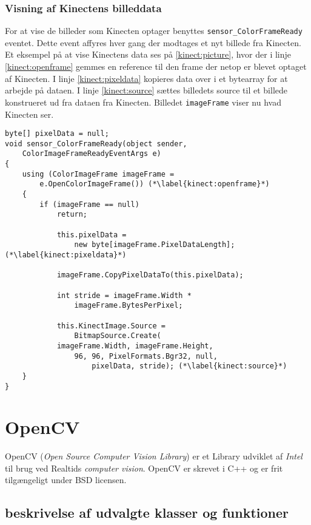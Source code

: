 \subsubsection{Visning af Kinectens billeddata}
For at vise de billeder som Kinecten optager benyttes \lstinline[style=csharp]!sensor_ColorFrameReady! eventet. 
Dette event affyres hver gang der modtages et nyt billede fra Kinecten. 
Et eksempel på at vise Kinectens data ses på \cref{kinect:picture}, hvor der i linje \ref{kinect:openframe} gemmes en reference til den frame der netop er blevet optaget af Kinecten.
I linje \ref{kinect:pixeldata} kopieres data over i et bytearray for at arbejde på dataen. 
I linje \ref{kinect:source} sættes billedets source til et billede konstrueret ud fra dataen fra Kinecten.
Billedet \lstinline[style=csharp]|imageFrame| viser nu hvad Kinecten ser.

\begin{lstlisting}[style=csharp,caption={Visning af billeddata fra Kinectens RGB-kamera}, label=kinect:picture]
byte[] pixelData = null;
void sensor_ColorFrameReady(object sender,
	ColorImageFrameReadyEventArgs e)
{
    using (ColorImageFrame imageFrame = 
    	e.OpenColorImageFrame()) (*\label{kinect:openframe}*)
    {
        if (imageFrame == null)
            return;

            this.pixelData = 
            	new byte[imageFrame.PixelDataLength];(*\label{kinect:pixeldata}*)

            imageFrame.CopyPixelDataTo(this.pixelData);

            int stride = imageFrame.Width *
            	imageFrame.BytesPerPixel;

            this.KinectImage.Source = 
            	BitmapSource.Create(
            imageFrame.Width, imageFrame.Height, 
            	96, 96, PixelFormats.Bgr32, null, 
            		pixelData, stride); (*\label{kinect:source}*)
    }
}    
\end{lstlisting}




\section{OpenCV}
OpenCV (\emph{Open Source Computer Vision Library}) er et Library udviklet af \emph{Intel}
til brug ved Realtids \emph{computer vision}.
OpenCV er skrevet i C++ og er frit tilgængeligt under BSD licensen.

\subsection{beskrivelse af udvalgte klasser og funktioner}



